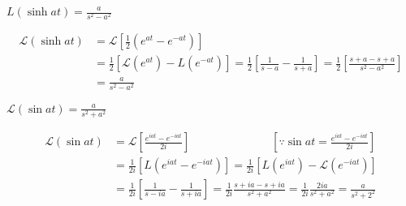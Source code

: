 \begin{exercise}
	$L(\sinh a t)=\frac{a}{s^{2}-a^{2}}$
\end{exercise}
\begin{answer}
	\begin{align*}
	\mathcal{L}(\sinh a t) &=\mathcal{L}\left[\frac{1}{2}\left(e^{a t}-e^{-a t}\right)\right] \\
	&=\frac{1}{2}\left[\mathcal{L}\left(e^{a t}\right)-L\left(e^{-a t}\right)\right]=\frac{1}{2}\left[\frac{1}{s-a}-\frac{1}{s+a}\right]=\frac{1}{2}\left[\frac{s+a-s+a}{s^{2}-a^{2}}\right] \\
	&=\frac{a}{s^{2}-a^{2}}
	\end{align*}
\end{answer}
\begin{exercise}
	$\mathcal{L}(\sin a t)=\frac{a}{s^{2}+a^{2}}$
\end{exercise}
\begin{answer}
	\begin{align*}
\mathcal{L}(\sin a t)&=\mathcal{L}\left[\frac{e^{i a t}-e^{-i a t}}{2 i}\right]\hspace{3cm} \left[\because \sin a t=\frac{e^{i a t}-e^{-i a t}}{2 i}\right]\\
	&=\frac{1}{2 i}\left[L\left(e^{i a t}-e^{-i a t}\right)\right]=\frac{1}{2 i}\left[L\left(e^{i a t}\right)-\mathcal{L}\left(e^{-i a t}\right)\right] \\
	&=\frac{1}{2 i}\left[\frac{1}{s-i a}-\frac{1}{s+i a}\right]=\frac{1}{2 i} \frac{s+i a-s+i a}{s^{2}+a^{2}}=\frac{1}{2 i} \frac{2 i a}{s^{2}+a^{2}}=\frac{a}{s^{2}+2^{2}}
	\end{align*}
\end{answer}









